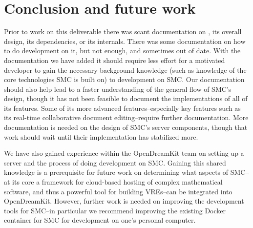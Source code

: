 \documentclass{deliverablereport}
\begin{document}
\section{Conclusion and future work}
Prior to work on this deliverable there was scant documentation on \SMC, its
overall design, its dependencies, or its internals.  There was some
documentation on how to do development on it, but not enough, and sometimes
out of date.  With the documentation we have added it should require less
effort for a motivated developer to gain the necessary background knowledge
(such as knowledge of the core technologies SMC is built on) to development on
SMC.  Our documentation should also help lead to a faster understanding of
the general flow of SMC's design, though it has not been feasible to document
the implementations of all of its features.  Some of its more advanced
features--especially key features such as its real-time collaborative document
editing--require further documentation.  More documentation is needed on the
design of SMC's server components, though that work should wait until their
implementation has stabilized more.

We have also gained experience within the OpenDreamKit team on setting up a
\SMC server and the process of doing development on SMC.  Gaining this shared
knowledge is a prerequisite for future work on determining what aspects of
SMC--at its core a framework for cloud-based hosting of complex mathematical
software, and thus a powerful tool for building VREs--can be integrated into
OpenDreamKit.  However, further work is needed on improving the development
tools for SMC--in particular we recommend improving the existing Docker
container for SMC for development on one's personal computer.


\printbibliography
\end{document}
